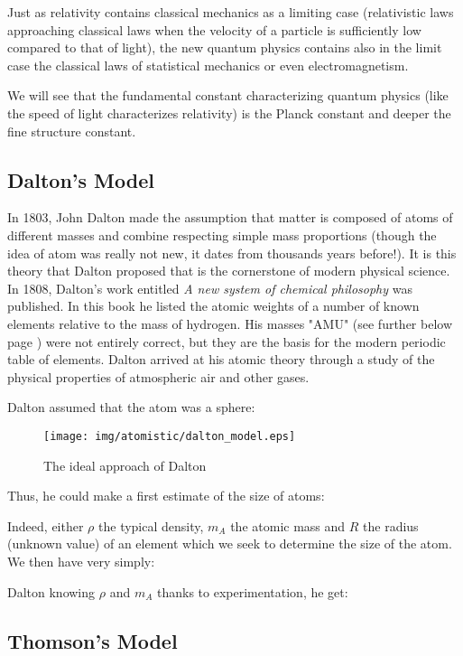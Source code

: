 	Just as relativity contains classical mechanics as a limiting case (relativistic laws approaching classical laws when the velocity of a particle is sufficiently low compared to that of light), the new quantum physics contains also in the limit case the classical laws of statistical mechanics or even electromagnetism.

	\begin{tcolorbox}[title=Remark,colframe=black,arc=10pt]
	We will see that the fundamental constant characterizing quantum physics (like the speed of light characterizes relativity) is the Planck constant and deeper the fine structure constant.
	\end{tcolorbox}	

	\subsection{Dalton's Model}

In 1803, John Dalton made the assumption that matter is composed of atoms of different masses and combine respecting simple mass proportions (though the idea of atom was really not new, it dates from thousands years before!). It is this theory that Dalton proposed that is the cornerstone of modern physical science. In 1808, Dalton's work entitled \textit{A new system of chemical philosophy} was published. In this book he listed the atomic weights of a number of known elements relative to the mass of hydrogen. His masses "AMU" (see further below page \pageref{atomic mass unit}) were not entirely correct, but they are the basis for the modern periodic table of elements. Dalton arrived at his atomic theory through a study of the physical properties of atmospheric air and other gases.

Dalton assumed that the atom was a sphere:

\begin{figure}[H]
\centering
\texttt{[image: img/atomistic/dalton\_model.eps]}
\caption{The ideal approach of Dalton}
\end{figure}

Thus, he could make a first estimate of the size of atoms:

Indeed, either $\rho$ the typical density, $m_A$ the atomic mass and $R$ the radius (unknown value) of an element which we seek to determine the size of the atom. We then have very simply:
	
Dalton knowing $\rho$ and  $m_A$ thanks to experimentation, he get:
	

\subsection{Thomson's Model}

